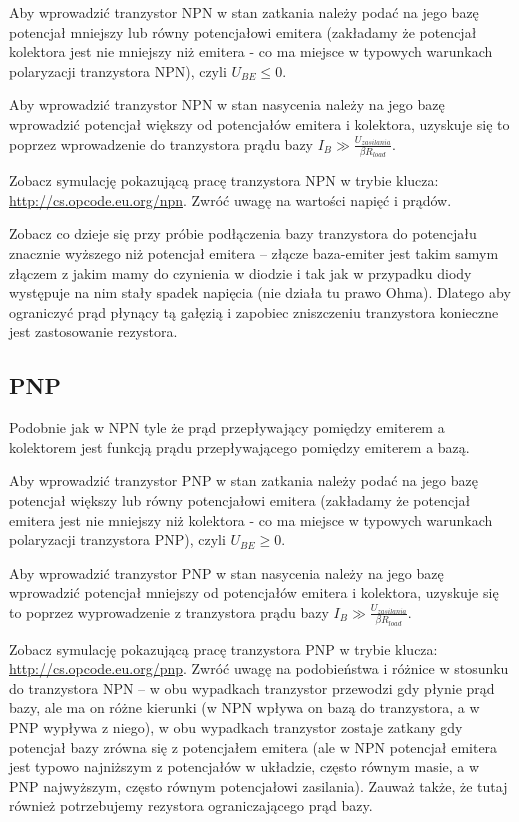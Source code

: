 Aby wprowadzić tranzystor NPN w stan zatkania należy podać na jego bazę potencjał mniejszy lub równy potencjałowi emitera (zakładamy że potencjał kolektora jest nie mniejszy niż emitera - co ma miejsce w typowych warunkach polaryzacji tranzystora NPN), czyli $U_{BE} \leq 0$.

Aby wprowadzić tranzystor NPN w stan nasycenia należy na jego bazę wprowadzić potencjał większy od potencjałów emitera i kolektora, uzyskuje się to poprzez wprowadzenie do tranzystora prądu bazy $I_B \gg \frac{U_{zasilania}}{\beta R_{load}}$.

Zobacz symulację pokazującą pracę tranzystora NPN w trybie klucza: \url{http://cs.opcode.eu.org/npn}.
Zwróć uwagę na wartości napięć i prądów.

Zobacz co dzieje się przy próbie podłączenia bazy tranzystora do potencjału znacznie wyższego niż potencjał emitera – złącze baza-emiter jest takim samym złączem z jakim mamy do czynienia w diodzie i tak jak w przypadku diody występuje na nim stały spadek napięcia (nie działa tu prawo Ohma). Dlatego aby ograniczyć prąd płynący tą gałęzią i zapobiec zniszczeniu tranzystora konieczne jest zastosowanie rezystora.

\subsection{PNP}
Podobnie jak w NPN tyle że prąd przepływający pomiędzy emiterem a kolektorem jest funkcją prądu przepływającego pomiędzy emiterem a bazą.

Aby wprowadzić tranzystor PNP w stan zatkania należy podać na jego bazę potencjał większy lub równy potencjałowi emitera (zakładamy że potencjał emitera jest nie mniejszy niż kolektora - co ma miejsce w typowych warunkach polaryzacji tranzystora PNP), czyli $U_{BE} \geq 0$.

Aby wprowadzić tranzystor PNP w stan nasycenia należy na jego bazę wprowadzić potencjał mniejszy od potencjałów emitera i kolektora, uzyskuje się to poprzez wyprowadzenie z tranzystora prądu bazy $I_B \gg \frac{U_{zasilania}}{\beta R_{load}}$.

Zobacz symulację pokazującą pracę tranzystora PNP w trybie klucza: \url{http://cs.opcode.eu.org/pnp}.
Zwróć uwagę na podobieństwa i różnice w stosunku do tranzystora NPN –
	w obu wypadkach tranzystor przewodzi gdy płynie prąd bazy, ale ma on różne kierunki (w NPN wpływa on bazą do tranzystora, a w PNP wypływa z niego),
	w obu wypadkach tranzystor zostaje zatkany gdy potencjał bazy zrówna się z potencjałem emitera (ale w NPN potencjał emitera jest typowo najniższym z potencjałów w układzie, często równym masie, a w PNP najwyższym, często równym potencjałowi zasilania).
Zauważ także, że tutaj również potrzebujemy rezystora ograniczającego prąd bazy.

